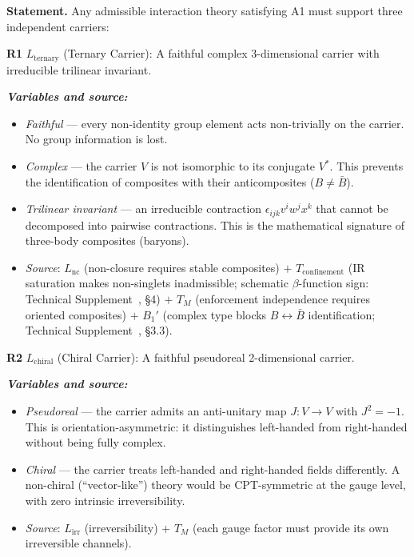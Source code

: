 \documentclass[11pt]{article}
\newenvironment{varlist}{\begin{itemize}[nosep,leftmargin=2em]}{\end{itemize}}
\begin{document}
\begin{tcolorbox}[apfbox, title={Theorem R: Representation Requirements from Admissibility}]
\textbf{Statement.}  Any admissible interaction theory satisfying A1 must support three independent carriers:

\medskip
\textbf{R1} $L_{\mathrm{ternary}}$ (Ternary Carrier): A faithful complex 3-dimensional carrier with irreducible trilinear invariant.

\smallskip\noindent\textbf{\textit{Variables and source:}}
\begin{varlist}
\item \textit{Faithful} --- every non-identity group element acts non-trivially on the carrier.  No group information is lost.
\item \textit{Complex} --- the carrier $V$ is not isomorphic to its conjugate $V^*$.  This prevents the identification of composites with their anticomposites ($B \ne \bar{B}$).
\item \textit{Trilinear invariant} --- an irreducible contraction $\epsilon_{ijk} v^i w^j x^k$ that cannot be decomposed into pairwise contractions.  This is the mathematical signature of three-body composites (baryons).
\item \textit{Source}: $L_{\mathrm{nc}}$ (non-closure requires stable composites) $+$ $T_{\mathrm{confinement}}$ (IR saturation makes non-singlets inadmissible; schematic $\beta$-function sign: Technical Supplement~\cite{BrookeP2Supplement}, \S4) $+$ $T_M$ (enforcement independence requires oriented composites) $+$ $B_1'$ (complex type blocks $B \leftrightarrow \bar{B}$ identification; Technical Supplement~\cite{BrookeP2Supplement}, \S3.3).
\end{varlist}

\medskip
\textbf{R2} $L_{\mathrm{chiral}}$ (Chiral Carrier): A faithful pseudoreal 2-dimensional carrier.

\smallskip\noindent\textbf{\textit{Variables and source:}}
\begin{varlist}
\item \textit{Pseudoreal} --- the carrier admits an anti-unitary map $J: V \to V$ with $J^2 = -1$.  This is orientation-asymmetric: it distinguishes left-handed from right-handed without being fully complex.
\item \textit{Chiral} --- the carrier treats left-handed and right-handed fields differently.  A non-chiral (``vector-like'') theory would be CPT-symmetric at the gauge level, with zero intrinsic irreversibility.
\item \textit{Source}: $L_{\mathrm{irr}}$ (irreversibility) $+$ $T_M$ (each gauge factor must provide its own irreversible channels).
\end{varlist}


\end{tcolorbox}
\end{document}

